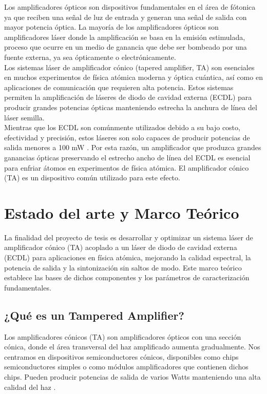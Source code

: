 \documentclass[12pt]{article}
\begin{document}
Los amplificadores ópticos son dispositivos fundamentales en el área de fótonica ya que reciben una señal de luz de entrada y generan una señal de salida con mayor potencia óptica. La mayoría de los amplificadores ópticos son amplificadores láser donde la amplificación se basa en la emisión estimulada, proceso que ocurre en un medio de ganancia que debe ser bombeado por una fuente externa, ya sea ópticamente o electrónicamente.
\\ \newline
Los sistemas láser de amplificador cónico (tapered amplifier, TA) son esenciales en muchos experimentos de física atómica moderna y óptica cuántica, así como en aplicaciones de comunicación que requieren alta potencia\cite{articlechi}. Estos sistemas permiten la amplificación de láseres de diodo de cavidad externa (ECDL) para producir grandes potencias ópticas manteniendo estrecha la anchura de línea del láser semilla.
\\ \newline
Mientras que los ECDL son comúnmente utilizados debido a su bajo costo, efectividad y precisión, estos láseres son solo capaces de producir potencias de salida menores a 100 mW \cite{Wang}. Por esta razón, un amplificador que produzca grandes ganancias ópticas preservando el estrecho ancho de línea del ECDL es esencial para enfriar átomos en experimentos de física atómica. El amplificador cónico (TA) es un dispositivo común utilizado para este efecto.



\section{Estado del arte y Marco Teórico}
La finalidad del proyecto de tesis es desarrollar y optimizar un sistema láser de amplificador cónico (TA) acoplado a un láser de diodo de cavidad externa (ECDL) para aplicaciones en física atómica, mejorando la calidad espectral, la potencia de salida y la sintonización sin saltos de modo. Este marco teórico establece las bases de dichos componentes y los parámetros de caracterización fundamentales.

\subsection{¿Qué es un Tampered Amplifier?}
Los amplificadores cónicos (TA) son amplificadores ópticos con una sección cónica, donde el área transversal del haz amplificado aumenta gradualmente. Nos centramos en dispositivos semiconductores cónicos, disponibles como chips semiconductores simples o como módulos amplificadores que contienen dichos chips. Pueden producir potencias de salida de varios Watts manteniendo una alta calidad del haz \cite{Paschotta_2019_tapered_amplifiers}.
\end{document}
